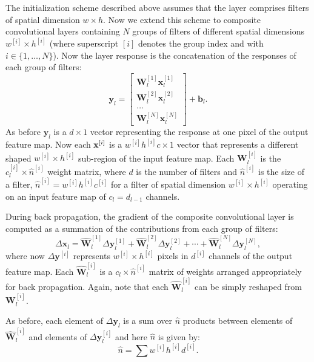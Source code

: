\documentclass[thesis]{subfiles}
\begin{document}
    The initialization scheme described above assumes that the layer comprises filters of spatial dimension $w \times h$. Now we extend this scheme to composite convolutional layers containing $N$ groups of filters of different spatial dimensions $w^{[i]} \times h^{[i]}$ (where superscript $[i]$ denotes the group index and with $i\in \{1,\dots,N\}$). Now the layer response is the concatenation of the responses of each group of filters:
    \begin{equation}
    \mathbf{y}_l =\begin{bmatrix}\mathbf{W}_l^{[1]} \mathbf{x}_l^{[1]} \\ \mathbf{W}_l^{[2]} \mathbf{x}_l^{[2]} \\ \dots \\ \mathbf{W}_l^{[N]} \mathbf{x}_l^{[N]} \end{bmatrix} + \mathbf{b}_l.
    \end{equation}
    As before $\mathbf{y}_l$ is a $d \times 1$ vector representing the response at one pixel of the output feature map. Now each ${\bf x}^{[i]}$ is a $w^{[i]} h^{[i]} c \times 1$ vector that represents a different shaped $w^{[i]} \times h^{[i]}$ sub-region of the input feature map. Each $\mathbf{W}_l^{[i]}$ is the $c_l^{[i]}\times \hat{n}^{[i]}$ weight matrix, where $d$ is the number of filters and $\hat{n}^{[i]}$ is the size of a filter, \ie $\hat{n}^{[i]} = w^{[i]} h^{[i]} c^{[i]}$ for a filter of spatial dimension $w^{[i]} \times h^{[i]}$ operating on an input feature map of $c_l = d_{l-1}$ channels.
    
    During back propagation, the gradient of the composite convolutional layer is computed as a summation of the contributions from each group of filters:
    \begin{equation}
    \Delta \mathbf{x}_l = \hat{\mathbf{W}}_l^{[1]} \Delta \mathbf{y}_l^{[1]} +  \hat{\mathbf{W}}_l^{[2]} \Delta \mathbf{y}_l^{[2]} + \cdots+  \hat{\mathbf{W}}_l^{[N]} \Delta \mathbf{y}_l^{[N]},
    \label{eq:back_prop_gradient_composite}
    \end{equation}
    where now $\Delta \mathbf{y}^{[i]}$ represents $w^{[i]} \times h^{[i]}$ pixels in $d^{[i]}$ channels of the output feature map. Each $\hat{\mathbf{W}}_l^{[i]}$ is a $c_l \times \hat{n}^{[i]}$ matrix of weights arranged appropriately for back propagation. Again, note that each $\hat{\mathbf{W}}_l^{[i]}$ can be simply reshaped from $\mathbf{W}_l^{[i]}$.
    
    As before, each element of $\Delta \mathbf{y}_l$ is a sum over $\hat n$ products between elements of $\hat{\mathbf{W}}^{[i]}_l$ and elements of $\Delta \mathbf{y}^{[i]}_l$ and here $\hat{n}$ is given by:
    \begin{equation}
    \hat{n} = \sum{ w^{[i]} h^{[i]} d^{[i]}}.
    \end{equation}
    
\end{document}
